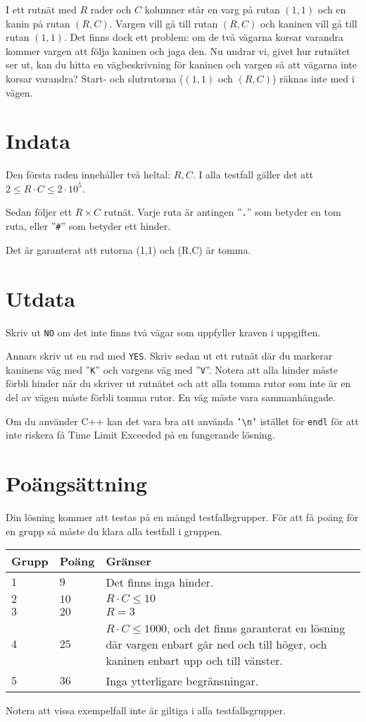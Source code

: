 I ett rutnät med $R$ rader och $C$ kolumner står en varg på rutan $(1, 1)$ och en kanin på rutan $(R, C)$.
Vargen vill gå till rutan $(R, C)$ och kaninen vill gå till rutan $(1, 1)$.
Det finns dock ett problem: om de två vägarna korsar varandra kommer vargen att följa kaninen och jaga den.
Nu undrar vi, givet hur rutnätet ser ut, kan du hitta en vägbeskrivning för kaninen och vargen så att vägarna inte korsar varandra?
Start- och slutrutorna ($(1, 1)$ och $(R, C)$) räknas inte med i vägen.

\section*{Indata}
Den första raden innehåller två heltal: $R, C$. I alla testfall gäller det att $2 \leq R \cdot C \leq 2 \cdot 10^5$.

Sedan följer ett $R \times C$ rutnät. Varje ruta är antingen ''\texttt{.}'' som betyder en tom ruta, eller ''\texttt{\#}'' som betyder ett hinder.

Det är garanterat att rutorna (1,1) och (R,C) är tomma.

\section*{Utdata}
Skriv ut \texttt{NO} om det inte finns två vägar som uppfyller kraven i uppgiften.

Annars skriv ut en rad med \texttt{YES}.
Skriv sedan ut ett rutnät där du markerar kaninens väg med ''\texttt{K}'' och vargens väg med ''\texttt{V}''.
Notera att alla hinder måste förbli hinder när du skriver ut rutnätet och att alla tomma rutor som inte är en del av vägen måste förbli tomma rutor.
En väg måste vara sammanhängade.

Om du använder C++ kan det vara bra att använda \texttt{'\textbackslash{}n'} istället för \texttt{endl} för att inte riskera få Time Limit Exceeded på en fungerande lösning.

\section*{Poängsättning}
Din lösning kommer att testas på en mängd testfallsgrupper.
För att få poäng för en grupp så måste du klara alla testfall i gruppen.

\noindent
\begin{tabular}{| l | l | p{12cm} |}
  \hline
  \textbf{Grupp} & \textbf{Poäng} & \textbf{Gränser} \\ \hline
  $1$   & $9$        & Det finns inga hinder. \\ \hline
  $2$   & $10$       & $R \cdot C \leq 10$  \\ \hline
  $3$   & $20$       & $R = 3$  \\ \hline
  $4$   & $25$       & $R \cdot C \leq 1000$, och det finns garanterat en lösning där vargen enbart går ned och till höger, och kaninen enbart upp och till vänster.  \\ \hline
  $5$   & $36$       & Inga ytterligare begränsningar.  \\ \hline
\end{tabular}

Notera att vissa exempelfall inte är giltiga i alla testfallsgrupper.
